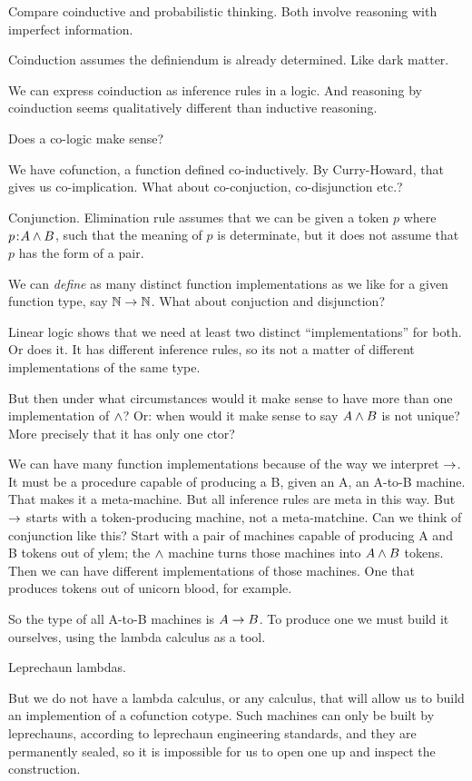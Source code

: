 \documentclass{article}
\begin{document}
Compare coinductive and probabilistic thinking. Both involve reasoning
with imperfect information.

Coinduction assumes the definiendum is already determined. Like dark
matter.

We can express coinduction as inference rules in a logic. And
reasoning by coinduction seems qualitatively different than inductive
reasoning.

Does a co-logic make sense?

We have cofunction, a function defined co-inductively. By
Curry-Howard, that gives us co-implication. What about co-conjuction,
co-disjunction etc.?

Conjunction. Elimination rule assumes that we can be given a token
\(p\) where \(p\hspace{1pt}\mathpunct{:}\hspace{-1pt}A\land B\), such that the meaning of \(p\) is
determinate, but it does not assume that \(p\) has the form of a pair.

We can \textit{define} as many distinct function implementations as we
like for a given function type, say \(\mathbb{N}\rightarrow\mathbb{N}\). What about
conjuction and disjunction?

Linear logic shows that we need at least two distinct
``implementations'' for both. Or does it. It has different inference
rules, so its not a matter of different implementations of the same
type.

But then under what circumstances would it make sense to have more
than one implementation of \(\land\)? Or: when would it make sense to
say \(A \land B\) is not unique? More precisely that it has only one
ctor?

We can have many function implementations because of the way we
interpret \(\rightarrow\). It must be a procedure capable of producing a B,
given an A, an A-to-B machine. That makes it a meta-machine. But all
inference rules are meta in this way. But \(\rightarrow\) starts with a
token-producing machine, not a meta-matchine. Can we think of
conjunction like this? Start with a pair of machines capable of
producing A and B tokens out of ylem; the \(\land\) machine turns
those machines into \(A\land B\) tokens. Then we can have different
implementations of those machines. One that produces tokens out of
unicorn blood, for example.

So the type of all A-to-B machines is \(A\rightarrow B\). To produce one we
must build it ourselves, using the lambda calculus as a tool.

Leprechaun lambdas.

But we do not have a lambda calculus, or any calculus, that will allow
us to build an implemention of a cofunction cotype. Such machines can
only be built by leprechauns, according to leprechaun engineering
standards, and they are permanently sealed, so it is impossible for us
to open one up and inspect the construction.
\end{document}
